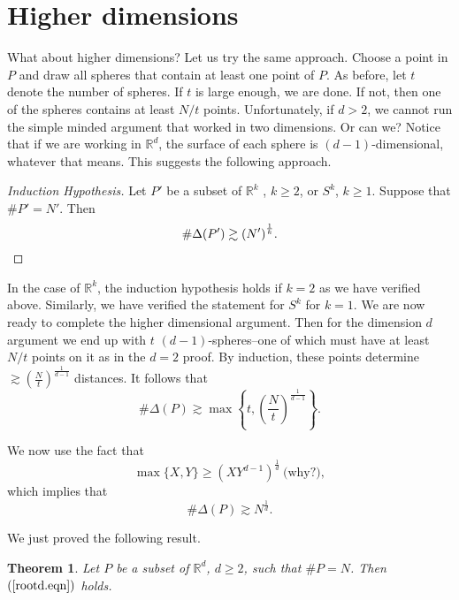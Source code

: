 \documentclass[]{stml-l}
\numberwithin{equation}{chapter}
\theoremstyle{plain}
\newtheorem{theorem}[equation]{Theorem}
\theoremstyle{definition}
\theoremstyle{remark}
\begin{document}
\section{Higher dimensions}

What about higher dimensions? Let us try the same approach. Choose
a point in $P$ and draw all spheres that contain at least one
point of $P$. As before, let $t$ denote the number of spheres. If
$t$ is large enough, we are done. If not, then one of the spheres
contains at least $N/t$ points. Unfortunately, if $d>2$, we cannot
run the simple minded argument that worked in two dimensions. Or
can we? Notice that if we are working in $\mathbb{R}^d$, the surface
of each sphere is $(d-1)$-dimensional, whatever that means. This
suggests the following approach.

\begin{proof}[Induction Hypothesis] Let $P'$ be a subset of ${\mathbb
R}^k$ , $k \ge 2$, or $S^{k}$, $k \ge 1$. Suppose that $\# P'=N'$.
Then
\[
 \# \Delta(P') \gtrsim {(N')}^{\frac{1}{k}}.  \qedhere
 \]
 \end{proof}

In the case of $\mathbb{R}^k$, the induction hypothesis holds if
$k=2$ as we have verified above. Similarly, we have verified the
statement for $S^k$ for $k=1$. We are now ready to complete the
higher dimensional argument.  Then for the dimension $d$ argument
we end up with $t$ $(d-1)$-spheres--one of which must have at
least $N/t$ points on it as in the $d=2$ proof. By induction,
these points determine $\gtrsim
{\left(\frac{N}{t}\right)}^{\frac{1}{d-1}}$ distances. It follows
that
\begin{equation}
\# \Delta(P) \gtrsim \max \left\{t,
{\left(\frac{N}{t}\right)}^{\frac{1}{d-1}} \right\}.
\end{equation}

We now use the fact that
\begin{equation}
\max \{X,Y\} \ge
{(XY^{d-1})}^{\frac{1}{d}} \ \text{(why?)},
\end{equation} which
implies that
\begin{equation} \label{rootd.eqn}
\# \Delta(P) \gtrsim N^{\frac{1}{d}}.
\end{equation}


We just proved the following result.

\begin{theorem} \label{higherdimerdos.thm}
Let $P$ be a subset of $\mathbb{R}^d$, $d \ge
2$, such that $\# P=N$. Then $(\ref{rootd.eqn})$ holds. \end{theorem}
\end{document}
